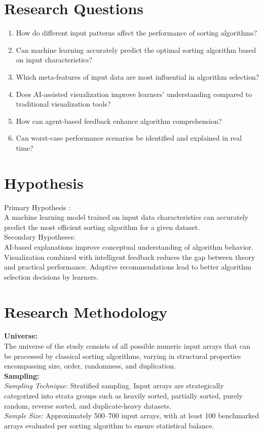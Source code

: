 \documentclass[12pt,a4paper,oneside,openany]{report}
\begin{document}
\section{Research Questions}
\begin{enumerate}
\item How do different input patterns affect the performance of sorting algorithms?
\item Can machine learning accurately predict the optimal sorting algorithm based on input characteristics?
\item Which meta-features of input data are most influential in algorithm selection?
\item Does AI-assisted visualization improve learners’ understanding compared to traditional visualization tools?
\item  How can agent-based feedback enhance algorithm comprehension?
\item Can worst-case performance scenarios be identified and explained in real time?

\end{enumerate}

\section{Hypothesis}
{\large Primary Hypothesis :}\\[0.5cm]
A machine learning model trained on input data characteristics can accurately predict the most efficient sorting algorithm for a given dataset.\\[1cm]
{\large Secondary Hypotheses:}\\[.5cm]
AI-based explanations improve conceptual understanding of algorithm behavior.
Visualization combined with intelligent feedback reduces the gap between theory and practical performance.
Adaptive recommendations lead to better algorithm selection decisions by learners.

\section{Research Methodology}
\textbf{Universe:}\\
The universe of the study consists of all possible numeric input arrays that can be processed by classical sorting algorithms, varying in structural properties encompassing size, order, randomness, and duplication.\\[0.5cm]

\textbf{Sampling:}\\
\textit{Sampling Technique:} Stratified sampling.
Input arrays are strategically categorized into strata groups such as heavily sorted, partially sorted, purely random, reverse sorted, and duplicate-heavy datasets.\\
\textit{Sample Size:} Approximately 500--700 input arrays, with at least 100 benchmarked arrays evaluated per sorting algorithm to ensure statistical balance.\\[0.5cm]
\end{document}
